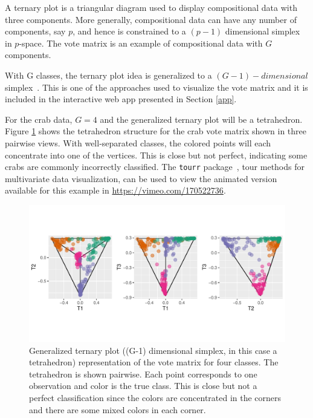 \documentclass[smallextended,natbib]{svjour3}\usepackage[]{graphicx}\usepackage[]{xcolor}
\makeatletter
\def\maxwidth{ %
  \ifdim\Gin@nat@width>\linewidth
    \linewidth
  \else
    \Gin@nat@width
  \fi
}
\newenvironment{knitrout}{}{} %
\makeatother
\begin{document}
A ternary plot is a triangular diagram used to display compositional data with three components. More generally, compositional data can have any number of components, say $p$, and hence is constrained to a $(p-1)$ dimensional simplex in $p$-space. The vote matrix is an example of compositional data with $G$ components.

With G classes, the ternary plot idea is generalized to a $(G-1)- dimensional$ simplex~\citep{sutherland2000orca, schloerke}. This is one of the approaches used to visualize the vote matrix and it is included in the interactive web app presented in Section \ref{app}.

For the crab data, $G=4$ and the generalized ternary plot will be a tetrahedron. Figure \ref{tetra} shows the tetrahedron structure for the crab vote matrix shown in three pairwise views. With well-separated classes, the colored points will each concentrate into one of the vertices. This is close but not perfect, indicating some crabs are commonly incorrectly classified. The \verb#tourr# package~\citep{wickham2011tourr}, tour methods for multivariate data visualization, can be used to view the animated version available for this example in  \url{https://vimeo.com/170522736}.


\begin{figure}[hbpt]
\centering
\begin{knitrout}
\color{fgcolor}
\includegraphics[width=\maxwidth,trim=0cm 2cm 0cm 2cm, clip]{ternary-1} 
\end{knitrout}
\caption{Generalized ternary plot ((G-1) dimensional simplex, in this case a tetrahedron) representation of the vote matrix for four classes. The tetrahedron is shown pairwise. Each point corresponds to one observation and color is the true class. This is close but not a perfect classification since the colors are concentrated in the corners and there are some mixed colors in each corner.}
\label{tetra}
\end{figure}
\end{document}
